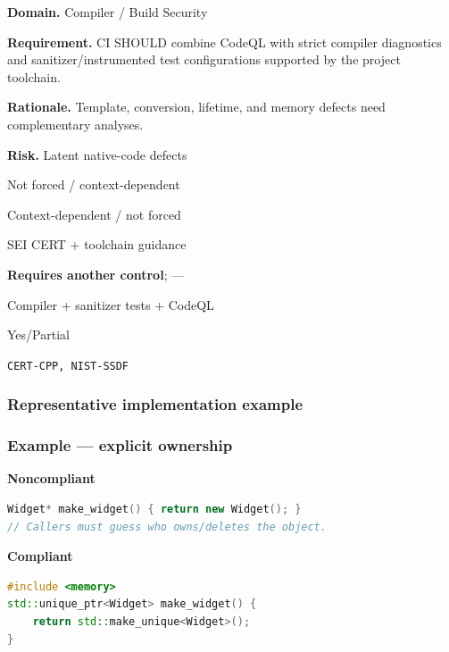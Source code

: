 \documentclass[10pt,letterpaper]{article}
\newcommand{\prioritybadge}[2]{\tcbox[on line,boxrule=0pt,arc=1.2mm,boxsep=0.7mm,left=1mm,right=1mm,top=0.4mm,bottom=0.4mm,colback=#2!12,coltext=#2]{\scriptsize\bfseries #1}}
\begin{document}
\begin{rulebox}[title={\texttt{SCS-CPP-BUILD-001} \hfill \prioritybadge{High Priority}{High}}]
\textbf{Domain.} Compiler / Build Security

\textbf{Requirement.} CI SHOULD combine CodeQL with strict compiler diagnostics and sanitizer/instrumented test configurations supported by the project toolchain.

\textbf{Rationale.} Template, conversion, lifetime, and memory defects need complementary analyses.

\textbf{Risk.} Latent native-code defects

\begin{description}[leftmargin=2.65cm,labelwidth=2.3cm,style=nextline,itemsep=1pt,topsep=3pt]
  \item[CWE] Not forced / context-dependent
  \item[OWASP] Context-dependent / not forced
  \item[CERT] SEI CERT + toolchain guidance
  \item[CodeQL] \textbf{Requires another control}; ---
  \item[Enforcement] Compiler + sanitizer tests + CodeQL
  \item[Automation] Yes/Partial
  \item[Sources] \texttt{CERT-CPP, NIST-SSDF}
\end{description}
\end{rulebox}
\subsubsection*{Representative implementation example}
\subsubsection*{Example --- explicit ownership}

\textbf{Noncompliant}\par
\begin{lstlisting}[language={C++}]
Widget* make_widget() { return new Widget(); }
// Callers must guess who owns/deletes the object.
\end{lstlisting}

\textbf{Compliant}\par
\begin{lstlisting}[language={C++}]
#include <memory>
std::unique_ptr<Widget> make_widget() {
    return std::make_unique<Widget>();
}
\end{lstlisting}
\end{document}
